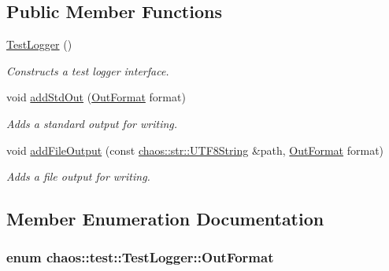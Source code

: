 \subsection*{Public Member Functions}
\begin{DoxyCompactItemize}
\item 
\hyperlink{classchaos_1_1test_1_1_test_logger_a59b5462eea92053f301b8c5e9c61892f}{Test\+Logger} ()
\begin{DoxyCompactList}\small\item\em Constructs a test logger interface. \end{DoxyCompactList}\item 
void \hyperlink{classchaos_1_1test_1_1_test_logger_a187403a01b59676a955817fa39bafbbb}{add\+Std\+Out} (\hyperlink{classchaos_1_1test_1_1_test_logger_a8e6f679501d623e41ac0f0c445a7820d}{Out\+Format} format)
\begin{DoxyCompactList}\small\item\em Adds a standard output for writing. \end{DoxyCompactList}\item 
void \hyperlink{classchaos_1_1test_1_1_test_logger_a0525b93567d29d8cf1f0de1b5b32be09}{add\+File\+Output} (const \hyperlink{classchaos_1_1str_1_1_u_t_f8_string}{chaos\+::str\+::\+U\+T\+F8\+String} \&path, \hyperlink{classchaos_1_1test_1_1_test_logger_a8e6f679501d623e41ac0f0c445a7820d}{Out\+Format} format)
\begin{DoxyCompactList}\small\item\em Adds a file output for writing. \end{DoxyCompactList}\end{DoxyCompactItemize}


\subsection{Member Enumeration Documentation}
\hypertarget{classchaos_1_1test_1_1_test_logger_a8e6f679501d623e41ac0f0c445a7820d}{}
\subsubsection[{Out\+Format}]{\setlength{\rightskip}{0pt plus 5cm}enum {\bf chaos\+::test\+::\+Test\+Logger\+::\+Out\+Format}}\label{classchaos_1_1test_1_1_test_logger_a8e6f679501d623e41ac0f0c445a7820d}


